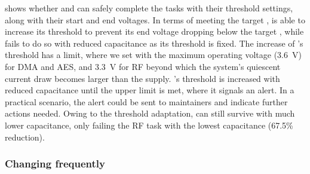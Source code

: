  shows whether \nn{} and \debs{} can safely complete the tasks with their threshold settings, along with their start and end voltages.
In terms of meeting the target , \nn{} is able to increase its threshold to prevent its end voltage dropping below the target , while \debs{} fails to do so with reduced capacitance as its threshold is fixed. 
The increase of \nn{}'s threshold has a limit, where we set with the maximum operating voltage (\SI{3.6}{\volt}) for DMA and AES, and \SI{3.3}{\volt} for RF beyond which the system's quiescent current draw becomes larger than the supply.
\nn{}'s threshold is increased with reduced capacitance until the upper limit is met, where it signals an alert.
In a practical scenario, the alert could be sent to maintainers and indicate further actions needed.  
Owing to the threshold adaptation, \nn{} can still survive with much lower capacitance, only failing the RF task with the lowest capacitance (67.5\% reduction). 



\subsubsection{Changing frequently}

